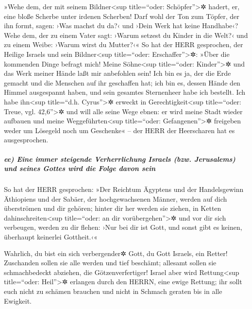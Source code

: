 »Wehe dem, der mit seinem Bildner\textless sup
title=``oder: Schöpfer''\textgreater✲ hadert, er, eine bloße Scherbe
unter irdenen Scherben! Darf wohl der Ton zum Töpfer, der ihn formt,
sagen: ›Was machst du da?‹ und ›Dein Werk hat keine Handhabe‹?
Wehe dem, der zu einem Vater sagt: ›Warum setzest du
Kinder in die Welt?‹ und zu einem Weibe: ›Warum wirst du Mutter?‹«
So hat der HERR gesprochen, der Heilige Israels und sein
Bildner\textless sup title=``oder: Erschaffer''\textgreater✲: »Über die
kommenden Dinge befragt mich! Meine Söhne\textless sup title=``oder:
Kinder''\textgreater✲ und das Werk meiner Hände laßt mir anbefohlen
sein! Ich bin es ja, der die Erde gemacht und die
Menschen auf ihr geschaffen hat; ich bin es, dessen Hände den Himmel
ausgespannt haben, und sein gesamtes Sternenheer habe ich bestellt.
Ich habe ihn\textless sup title=``d.h.
Cyrus''\textgreater✲ erweckt in Gerechtigkeit\textless sup title=``oder:
Treue, vgl. 42,6''\textgreater✲ und will alle seine Wege ebnen: er wird
meine Stadt wieder aufbauen und meine Weggeführten\textless sup
title=``oder: Gefangenen''\textgreater✲ freigeben weder um Lösegeld noch
um Geschenke« -- der HERR der Heerscharen hat es ausgesprochen.

\hypertarget{ee-eine-immer-steigende-verherrlichung-israels-bzw.-jerusalems-und-seines-gottes-wird-die-folge-davon-sein}{%
\subparagraph{ee) Eine immer steigende Verherrlichung Israels (bzw.
Jerusalems) und seines Gottes wird die Folge davon
sein}\label{ee-eine-immer-steigende-verherrlichung-israels-bzw.-jerusalems-und-seines-gottes-wird-die-folge-davon-sein}}

So hat der HERR gesprochen: »Der Reichtum Ägyptens und
der Handelsgewinn Äthiopiens und der Sabäer, der hochgewachsenen Männer,
werden auf dich überströmen und dir gehören; hinter dir her werden sie
ziehen, in Ketten dahinschreiten\textless sup title=``oder: an dir
vorübergehen''\textgreater✲ und vor dir sich verbeugen, werden zu dir
flehen: ›Nur bei dir ist Gott, und sonst gibt es keinen, überhaupt
keinerlei Gottheit.‹«

Wahrlich, du bist ein sich verbergender✲ Gott, du Gott
Israels, ein Retter! Zuschanden sollen sie alle werden
und tief beschämt; allesamt sollen sie schmachbedeckt abziehen, die
Götzenverfertiger! Israel aber wird Rettung\textless sup
title=``oder: Heil''\textgreater✲ erlangen durch den HERRN, eine ewige
Rettung; ihr sollt euch nicht zu schämen brauchen und nicht in Schmach
geraten bis in alle Ewigkeit.

